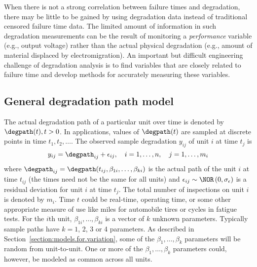 When there is not a strong correlation between failure times and
degradation, there may be little to be gained by
using degradation data instead of traditional censored failure time
data. The limited amount of information in such degradation
measurements can be the result of monitoring a {\em
performance} variable (e.g., output voltage) rather than the actual
physical degradation (e.g., amount of material displaced by
electromigration).  An important but difficult engineering challenge of
degradation analysis is to find variables that are closely related to 
failure time and develop methods for accurately measuring these variables.

\subsection{General degradation path model}
\label{section:general.degradation.model}

The actual degradation path of a particular unit over time is
denoted by $\degpath(t), t > 0$. In applications, values of
$\degpath(t)$
are sampled at discrete points in time $t_{1}, t_{2}, \dots $.
The observed sample degradation $y_{ij}$ of unit $i$ at time $t_j$ is
\begin{equation}
\label{equation:general.deg.path.model}
y_{ij} = \degpath_{ij} + \epsilon_{ij},\quad i
= 1, \dots, n, \quad j = 1, \dots, m_{i}
\end{equation}
where $\degpath_{ij}=\degpath(t_{ij},\beta_{1i},\dots,\beta_{ki})$ 
is the actual
path of the unit $i$ at time $t_{ij}$ (the times need not be the
same for all units) and $\epsilon_{ij}\sim \NOR
\left(0,\sigma_{\epsilon}\right)$ is a residual deviation
for unit $i$ at time $t_j$. The
total number of inspections on unit $i$ is denoted by $m_{i}$.
Time $t$ could be real-time, operating time, or some other appropriate
measure of use like
miles for automobile tires or cycles in fatigue tests.  For the $i$th
unit, $\beta_{1i}, \dots , \beta_{ki}$ is a vector of $k$ unknown
parameters.  Typically sample paths have $k=1$, 2, 3 or 4 parameters.
As described in Section~\ref{section:models.for.variation}, some of
the $\beta_{1},
\dots,\beta_{k}$ parameters will be random from unit-to-unit.  One or
more of the $\beta_{1},
\dots,\beta_{k}$ parameters could, however, be modeled as
common across all units.

